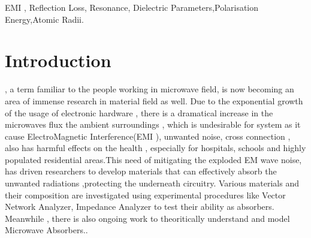 \documentclass[journal]{IEEEtran}
\begin{document}
\begin{IEEEkeywords}
EMI , Reflection Loss, Resonance, Dielectric Parameters,Polarisation Energy,Atomic Radii.
\end{IEEEkeywords}






%
\IEEEpeerreviewmaketitle



\section{Introduction}
% 
% 
% 
% 
 , a term familiar to the people working in microwave field, is now becoming an area of immense research in material field as well. Due to the exponential growth of the usage of electronic hardware , there is a dramatical increase in the microwaves flux the ambient surroundings , which is undesirable for system as it cause ElectroMagnetic Interference(EMI ), unwanted noise, cross connection , also has harmful effects on the health , especially for hospitals, schools and highly populated residential areas.This need of mitigating the exploded EM wave noise, has driven researchers to develop materials that can effectively absorb the unwanted radiations ,protecting the underneath circuitry. Various materials and their composition are investigated using experimental procedures like Vector Network Analyzer, Impedance Analyzer to test their ability as absorbers. Meanwhile , there is also ongoing work to theoritically understand and model Microwave Absorbers..
\end{document}
